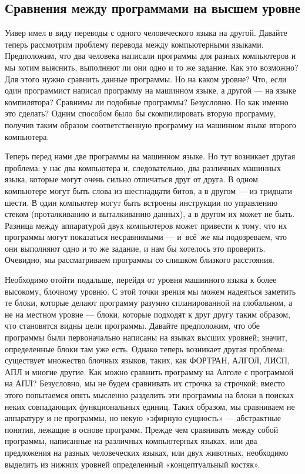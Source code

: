 \documentclass[../main.tex]{subfiles}
\begin{document}
\subsection{Сравнения между программами на высшем уровне}

Уивер имел в виду переводы с одного человеческого языка на другой. Давайте теперь рассмотрим проблему перевода между компьютерными языками. Предположим, что два человека написали программы для разных компьютеров и мы хотим выяснить, выполняют ли они одно и то же задание. Как это возможно? Для этого нужно сравнить данные программы. Но на каком уровне? Что, если один программист написал программу на машинном языке, а другой --- на языке компилятора? Сравнимы ли подобные программы? Безусловно. Но как именно это сделать? Одним способом было бы скомпилировать вторую программу, получив таким образом соответственную программу на машинном языке второго компьютера.

Теперь перед нами две программы на машинном языке. Но тут возникает другая проблема: у нас два компьютера и, следовательно, два различных машинных языка, которые могут очень сильно отличаться друг от друга. В одном компьютере могут быть слова из шестнадцати битов, а в другом --- из тридцати шести. В один компьютер могут быть встроены инструкции по управлению стеком (проталкиванию и выталкиванию данных), а в другом их может не быть. Разница между аппаратурой двух компьютеров может привести к тому, что их программы могут показаться несравнимыми --- и~всё~же мы подозреваем, что они выполняют одно и то же задание, и нам бы хотелось это проверить. Очевидно, мы рассматриваем программы со слишком близкого расстояния.

Необходимо отойти подальше, перейдя от уровня машинного языка к более высокому, блочному уровню. С этой точки зрения мы можем надеяться заметить те блоки, которые делают программу разумно спланированной на глобальном, а не на местном уровне --- блоки, которые подходят к друг другу таким образом, что становятся видны цели программы. Давайте предположим, что обе программы были первоначально написаны на языках высших уровней; значит, определенные блоки там уже есть. Однако теперь возникает другая проблема: существует множество блочных языков, таких, как ФОРТРАН, АЛГОЛ, ЛИСП, АПЛ и многие другие. Как можно сравнить программу на Алголе с программой на АПЛ? Безусловно, мы не будем сравнивать их строчка за строчкой; вместо этого попытаемся опять мысленно разделить эти программы на блоки в поисках неких совпадающих функциональных единиц. Таких образом, мы сравниваем не аппаратуру и не программы, но некую «эфирную сущность» --- абстрактные понятия, лежащие в основе программ. Прежде чем сравнивать между собой программы, написанные на различных компьютерных языках, или два предложения на разных человеческих языках, или двух животных, необходимо выделить из нижних уровней определенный «концептуальный костяк».
\end{document}
